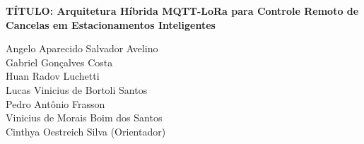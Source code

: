 \documentclass[
article,            %
11pt,               %
twoside,            %
a4paper,            %
section=TITLE,      %
onecolumn,          %
english,            %
brazil,             %
sumario=tradicional
]{abntex2}
\begin{document}
\begin{center}
    {\bfseries TÍTULO: Arquitetura Híbrida MQTT-LoRa para Controle Remoto de Cancelas em Estacionamentos Inteligentes} \\
    \vspace{0.5cm}
\end{center}

\begin{flushright}
    \fontsize{7}{9}\selectfont
    Angelo Aparecido Salvador Avelino\footnotemark[1] \quad   \\
    Gabriel Gonçalves Costa\footnotemark[2] \quad \\
    Huan Radov Luchetti\footnotemark[3] \quad  \\
    Lucas Vinicius de Bortoli Santos\footnotemark[4] \quad  \\
    Pedro Antônio Frasson\footnotemark[5] \quad  \\
    Vinicius de Morais Boim dos Santos\footnotemark[6] \quad  \\
    Cinthya Oestreich Silva (Orientador)\footnotemark[7] \\
\end{flushright}

\vspace{1cm}


\vspace{1cm}

\frenchspacing
\end{document}
